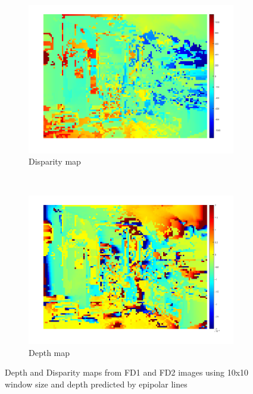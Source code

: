 \documentclass[a4paper, 10pt, conference]{ieeeconf}
\begin{document}


\begin{figure}[!ht]
  \captionsetup[subfigure]{position=b}
  \centering
    \begin{subfigure}{0.45\linewidth}
      \includegraphics[width=\textwidth]{pic/q2_2_cd3_dis}
      \caption{Disparity map}
    \end{subfigure}
    ~
    \begin{subfigure}{0.45\linewidth}
      \includegraphics[width=\textwidth]{pic/q2_2_cd3_depth10}
      \caption{Depth map}
    \end{subfigure}

	\caption{Depth and Disparity maps from FD1 and FD2 images using 10x10 window size and depth predicted by epipolar lines}
  \label{fig:depth10}
\end{figure}
\end{document}
